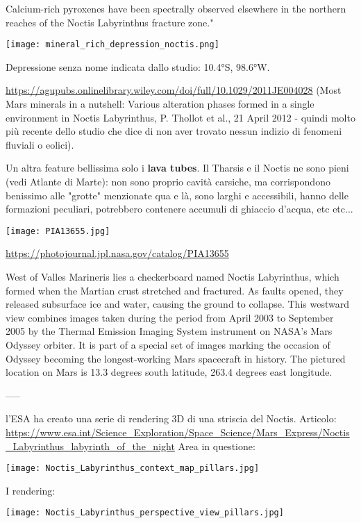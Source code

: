 \documentclass[a4paper,10pt,openany,oneside]{memoir}
\begin{document}
Calcium-rich pyroxenes have been spectrally observed elsewhere in the northern reaches of the Noctis Labyrinthus fracture zone."


\texttt{[image: mineral\_rich\_depression\_noctis.png]}

Depressione senza nome indicata dallo studio: 10.4°S, 98.6°W.

\url{https://agupubs.onlinelibrary.wiley.com/doi/full/10.1029/2011JE004028} (Most Mars minerals in a nutshell: Various alteration phases formed in a single environment in Noctis Labyrinthus, P. Thollot et al., 21 April 2012 - quindi molto più recente dello studio che dice di non aver trovato nessun indizio di fenomeni fluviali o eolici).

Un altra feature bellissima solo i \textbf{lava tubes}. Il Tharsis e il Noctis ne sono pieni (vedi Atlante di Marte): non sono proprio cavità carsiche, ma corrispondono benissimo alle "grotte" menzionate qua e là, sono larghi e accessibili, hanno delle formazioni peculiari, potrebbero contenere accumuli di ghiaccio d'acqua, etc etc...




\texttt{[image: PIA13655.jpg]}

\url{https://photojournal.jpl.nasa.gov/catalog/PIA13655}

West of Valles Marineris lies a checkerboard named Noctis Labyrinthus, which formed when the Martian crust stretched and fractured. As faults opened, they released subsurface ice and water, causing the ground to collapse. This westward view combines images taken during the period from April 2003 to September 2005 by the Thermal Emission Imaging System instrument on NASA's Mars Odyssey orbiter. It is part of a special set of images marking the occasion of Odyssey becoming the longest-working Mars spacecraft in history. The pictured location on Mars is 13.3 degrees south latitude, 263.4 degrees east longitude.

-----


l'ESA ha creato una serie di rendering 3D di una striscia del Noctis. Articolo: \url{https://www.esa.int/Science_Exploration/Space_Science/Mars_Express/Noctis_Labyrinthus_labyrinth_of_the_night} Area in questione:


\texttt{[image: Noctis\_Labyrinthus\_context\_map\_pillars.jpg]}

I rendering:

\texttt{[image: Noctis\_Labyrinthus\_perspective\_view\_pillars.jpg]}
\end{document}
